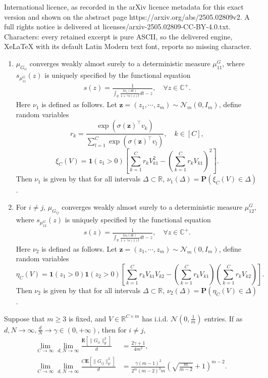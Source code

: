 \documentclass[10pt,a4paper]{amsart}
\newcommand\mf{\mathbf}
\newcommand\ml{\mathcal}
\newcommand{\E}{\mathbf{E}}
\newcommand{\R}{\mathbb{R}}
\newcommand{\bea}{\begin{equation}\begin{aligned}}
\newcommand{\eea}{\end{aligned}\end{equation}}
\newcommand{\mb}{\mathbb}
\newcommand{\rw}{\rightarrow}
\renewcommand{\l}{\left}
\renewcommand{\r}{\right}
\begin{document}
International licence, as recorded in the arXiv licence metadata for this exact version and shown on the abstract page https://arxiv.org/abs/2505.02809v2. A full rights notice is delivered at licenses/arxiv-2505.02809-CC-BY-4.0.txt. Characters: every retained excerpt is pure ASCII, so the delivered engine, XeLaTeX with its default Latin Modern text font, reports no missing character.
    \begin{enumerate}
        \item $\mu_{G_{ii}}$ converges weakly almost surely to a deterministic measure $\mu^G_{11}$, where $s_{\mu^G_{11}}(z)$ is uniquely specified by the functional equation
        \bea\label{MP_NN_CE_Hwiwi}
        s(z)=\frac{1}{\int_{\mb{R}} \frac{t\nu_{1}(dt)}{1+\gamma s(z)t}
 dt -z},\quad \forall z\in \mb{C}^+. 
\eea
Here $\nu_1$ is defined as follows. Let 
$\mf{z}=(z_1,\cdots,z_m)\sim \mathcal{N}_m(0,I_m)$, define random variables
$$
r_k=\frac{\exp(\sigma(\mf{z})^\top v_k)}{\sum_{l=1}^C\exp(\sigma(\mf{z})^\top v_l)},\quad k\in [C],
$$
$$
\xi_C(V)=\mf{1}(z_1>0)\l[\sum_{k=1}^C r_kV_{k1}^2-\l(\sum_{k=1}^C r_k V_{k1}\r)^2\r].
$$
Then $\nu_1$ is given by that for all intervals $\Delta\subset \mb{R}$, $\nu_1(\Delta)=\mf{P}(\xi_C(V)\in \Delta)$.

        
        \item For $i\ne j$, $\mu_{G_{ij}}$ converges weakly almost surely to a deterministic measure $\mu^G_{12}$, where $s_{\mu^G_{12}}(z)$ is uniquely specified by the functional equation
\bea\label{MP_NN_CE_Hwiwj}
        s(z)=\frac{1}{\int_{\mb{R}} \frac{t\nu_{2}(dt)}{1+\gamma s(z)t}
 dt -z},\quad \forall z\in \mb{C}^+. 
\eea
Here $\nu_2$ is defined as follows. Let 
$\mf{z}=(z_1,\cdots,z_m)\sim \mathcal{N}_m(0,I_m)$, define random variables
$$
\eta_C(V)=\mf{1}(z_1>0)\mf{1}(z_2>0)\l[\sum_{k=1}^C r_kV_{k1}V_{k2}-\l(\sum_{k=1}^C r_k V_{k1}\r)\l(\sum_{k=1}^C r_k V_{k2}\r)\r].
$$
Then $\nu_2$ is given by that for all intervals $\Delta\subset \mb{R}$, $\nu_2(\Delta)=\mf{P}(\eta_C(V)\in \Delta)$.
    \end{enumerate}

\begin{prop}
    Suppose that $m\geq 3$ is fixed, and $V\in\R^{C\times m}$ has i.i.d. $\ml{N}(0,\frac{1}{m})$ entries. If as $d,N\rw\infty, \frac
    {d}{N}\rw \gamma\in (0,+\infty)$, then for $i\ne j$, 
    \bea
\lim_{C\rw\infty}\lim_{d,N\rw\infty}\frac{\E\l[\|G_{ii}\|_{\operatorname{F}}^2\r]}{d}&=\frac{2\gamma+1}{4m^2},\\
\lim_{C\rw\infty}\lim_{d,N\rw\infty}\frac{C\E\l[\|G_{ij}\|_{\operatorname{F}}^2\r]}{d}&=\frac{\gamma(m-1)^2}{2^m(m-2)^3m}\l(\sqrt{\frac{m}{m-2}}+1\r)^{m-2}.
        \eea
\end{prop}
\end{document}
